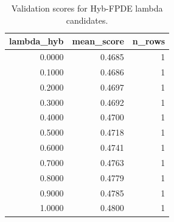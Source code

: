 \begin{table}[t]
\caption{Validation scores for Hyb-FPDE lambda candidates.}
\label{tab:lambda_distribution_computed}
\centering
\begin{tabular}{rrr}
\toprule
lambda\_hyb & mean\_score & n\_rows \\
\midrule
0.0000 & 0.4685 & 1 \\
0.1000 & 0.4686 & 1 \\
0.2000 & 0.4697 & 1 \\
0.3000 & 0.4692 & 1 \\
0.4000 & 0.4700 & 1 \\
0.5000 & 0.4718 & 1 \\
0.6000 & 0.4741 & 1 \\
0.7000 & 0.4763 & 1 \\
0.8000 & 0.4779 & 1 \\
0.9000 & 0.4785 & 1 \\
1.0000 & 0.4800 & 1 \\
\bottomrule
\end{tabular}

\end{table}
